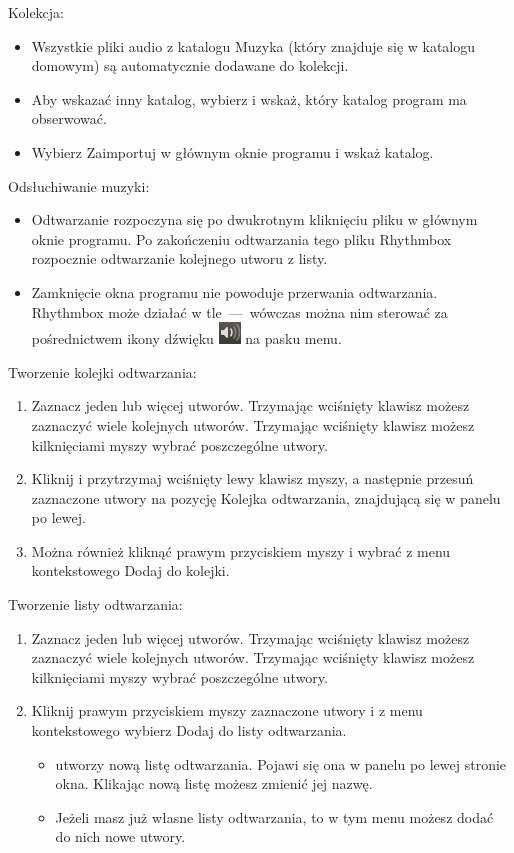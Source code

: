 Kolekcja:
\begin{itemize}
\item Wszystkie pliki audio z katalogu Muzyka (który znajduje się w katalogu domowym) są automatycznie dodawane do kolekcji.
\item Aby wskazać inny katalog, wybierz  i wskaż, który katalog program ma obserwować.
\item Wybierz \textcolor{ubuntu_orange}{Zaimportuj} w głównym oknie programu i wskaż katalog.
\end{itemize}
Odsłuchiwanie muzyki:
\begin{itemize}
\item Odtwarzanie rozpoczyna się po dwukrotnym kliknięciu pliku w głównym oknie programu. Po zakończeniu odtwarzania tego pliku Rhythmbox rozpocznie odtwarzanie kolejnego utworu z listy.
\item Zamknięcie okna programu nie powoduje przerwania odtwarzania. Rhythmbox może działać w tle~---~wówczas można nim sterować za pośrednictwem ikony dźwięku \includegraphics{images/ikony_dzwiek.png} na pasku menu.
\end{itemize}
Tworzenie kolejki odtwarzania:
\begin{enumerate}
\item Zaznacz jeden lub więcej utworów. Trzymając wciśnięty klawisz  możesz zaznaczyć wiele kolejnych utworów. Trzymając wciśnięty klawisz  możesz kilknięciami myszy wybrać poszczególne utwory.
\item Kliknij i przytrzymaj wciśnięty lewy klawisz myszy, a następnie przesuń zaznaczone utwory na pozycję \textcolor{ubuntu_orange}{Kolejka odtwarzania}, znajdującą się w panelu po lewej.
\item Można również kliknąć prawym przyciskiem myszy i wybrać z menu kontekstowego \textcolor{ubuntu_orange}{Dodaj do kolejki}.
\end{enumerate}
Tworzenie listy odtwarzania:
\begin{enumerate}
\item Zaznacz jeden lub więcej utworów. Trzymając wciśnięty klawisz  możesz zaznaczyć wiele kolejnych utworów. Trzymając wciśnięty klawisz  możesz kilknięciami myszy wybrać poszczególne utwory.
\item  Kliknij prawym przyciskiem myszy zaznaczone utwory i z menu kontekstowego wybierz \textcolor{ubuntu_orange}{Dodaj do listy odtwarzania}.
\begin{itemize}
\item {} utworzy nową listę odtwarzania. Pojawi się ona w panelu po lewej stronie okna. Klikając nową listę możesz zmienić jej nazwę.
\item Jeżeli masz już własne listy odtwarzania, to w tym menu możesz dodać do nich nowe utwory.
\end{itemize}
\end{enumerate}
